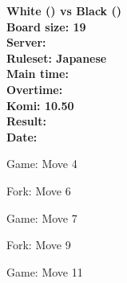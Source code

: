 \documentclass{article}
\begin{document}
\begin{titlepage}
    \null
    \vfill
    \begin{center}
        \textbf{White () vs Black ()}\\
        \textbf{Board size: 19}\\
        \textbf{Server: }\\
        \textbf{Ruleset: Japanese}\\
        \textbf{Main time: }\\
        \textbf{Overtime: }\\
        \textbf{Komi: 10.50}\\
        \textbf{Result: }\\
        \textbf{Date: }
    \end{center}
    \vfill
\end{titlepage}
\newpage
\begin{center}
\begin{section}{Game: Move 4}
\cleargoban
{}
\showfullgoban
\\\parbox{4.5in}{
}
\end{section}
\begin{section}{Fork: Move 6}
\cleargoban
{}
\showfullgoban
\\\parbox{4.5in}{
}
\end{section}
\begin{section}{Game: Move 7}
\cleargoban
{}
\showfullgoban
\\\parbox{4.5in}{
}
\end{section}
\begin{section}{Fork: Move 9}
\cleargoban
{}
\showfullgoban
\\\parbox{4.5in}{
}
\end{section}
\begin{section}{Game: Move 11}
\cleargoban
{}
\showfullgoban
\\\parbox{4.5in}{
}
\end{section}
\end{center}
\end{document}
